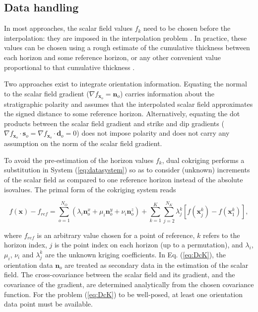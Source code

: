 \documentclass[preprint]{ring20}
\newcommand{\bx}{\mathbf{x}}
\newcommand{\bn}{\mathbf{n}}
\begin{document}
\subsection {Data handling}

In most approaches, the scalar field values $f_k$ need to be chosen before the interpolation: they are imposed in the interpolation problem \citep[e.g., ][]{Frank2007CG,Hillier2014MG,Renaudeau2019MG,Irakarama2022CD}. In practice, these values can be chosen using a rough estimate of the cumulative thickness between each horizon and some reference horizon, or any other convenient value proportional to that cumulative thickness \citep{Caumon2013GaRSITo,Collon2016I}. 

Two approaches exist to integrate orientation information. Equating the normal to the scalar field gradient ($\nabla f_{\bx_o} = \mathbf{n}_o$) carries information about the stratigraphic polarity and assumes that the interpolated scalar field approximates the signed distance to some reference horizon. Alternatively, equating the dot products between the scalar field gradient and strike and dip gradients ($\nabla f_{\bx_o} \cdot \mathbf{s}_o = \nabla f_{\bx_o} \cdot \mathbf{d}_o = 0$) does not impose polarity and does not carry any assumption on the norm of the scalar field gradient. 

To avoid the pre-estimation of the horizon values $f_k$, dual cokriging \citep[DcK, ][]{Lajaunie1997MG,Chiles04OMSMP} performs a substitution in System (\ref{eq:datasystem}) so as to consider (unknown) increments of the scalar field as compared to one reference horizon instead of the absolute isovalues. The primal form of the cokriging system reads

\begin{equation}
\label{eq:DcK}
f(\bx) - f_{ref} = \sum_{o=1}^{N_O} (\lambda_i \bn_o^x + \mu_i \bn_o^y + \nu_i \bn_o^z) + \sum_{k=1}^{K} \sum_{j=2}^{N_K} \lambda_{j}^{k}[f(\bx_j^k) - f(\bx_1^k)], 
\end{equation}

where $f_{ref}$ is an arbitrary value chosen for a point of reference, $k$ refers to the horizon index, $j$ is the point index on each horizon (up to a permutation), and $\lambda_i$, $\mu_i$, $\nu_i$ and $\lambda_j^k$ are the unknown kriging coefficients. In Eq. (\ref{eq:DcK}), the orientation data $\bn_o$ are treated as secondary data in the estimation of the scalar field. The cross-covariance between the scalar field and its gradient, and the covariance of the gradient, are determined analytically from the chosen covariance function. For the problem (\ref{eq:DcK}) to be well-posed, at least one orientation data point must be available. 
\end{document}
